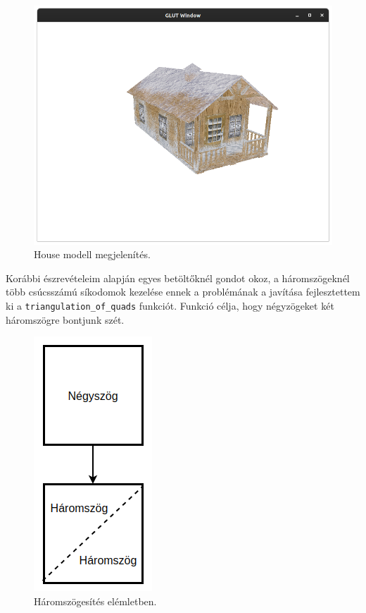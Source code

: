 \begin{figure}[h]
\centering
\includegraphics[width=\textwidth]{images/demo.png}
\caption{House modell megjelenítés.}
\label{fig:demo}
\end{figure}
\newpage
{}
Korábbi észrevételeim alapján egyes betöltőknél gondot okoz, a háromszögeknél több csúcsszámú síkodomok kezelése ennek a problémának a javítása fejlesztettem ki a \texttt{triangulation\_of\_quads} funkciót. Funkció célja, hogy négyzögeket két háromszögre bontjunk szét.
\begin{figure}[h]
\centering
\includegraphics[scale=0.39]{images/triangulation.png}
\caption{Háromszögesítés elémletben.}
\label{fig:tri}
\end{figure}

